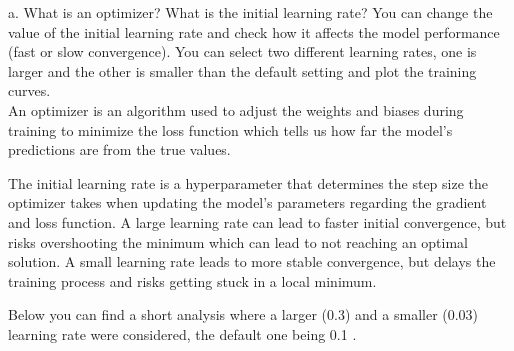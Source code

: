a. What is an optimizer? What is the initial learning rate? You can change the value of the initial learning rate and check how it affects the model performance (fast or slow convergence). You can select two different learning rates, one is larger and the other is
smaller than the default setting and plot the training curves. \\

An optimizer is an algorithm used to adjust the weights and biases during training to minimize the loss function which tells us how far the model's predictions are from the true values.

The initial learning rate is a hyperparameter that determines the step size the optimizer takes when updating the model's parameters regarding the gradient and loss function. A large learning rate can lead to faster initial convergence, but risks overshooting the minimum which can lead to not reaching an optimal solution. A small learning rate leads to more stable convergence, but delays the training process and risks getting stuck in a local minimum. 

Below you can find a short analysis where a larger (0.3) and a smaller (0.03) learning rate were considered, the default one being 0.1 .

